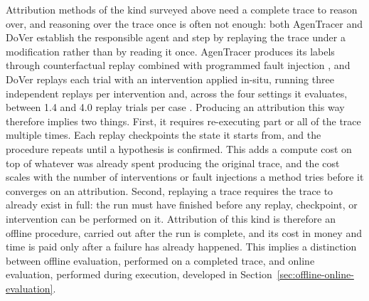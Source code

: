 Attribution methods of the kind surveyed above need a complete trace to reason over, and reasoning over the trace once is often not enough: both AgenTracer and DoVer establish the responsible agent and step by replaying the trace under a modification rather than by reading it once. AgenTracer produces its labels through counterfactual replay combined with programmed fault injection \cite{zhangAgenTracerWhoInducing2025}, and DoVer replays each trial with an intervention applied in-situ, running three independent replays per intervention and, across the four settings it evaluates, between 1.4 and 4.0 replay trials per case \cite{maDoVerInterventionDrivenAuto2026}. Producing an attribution this way therefore implies two things. First, it requires re-executing part or all of the trace multiple times. Each replay checkpoints the state it starts from, and the procedure repeats until a hypothesis is confirmed. This adds a compute cost on top of whatever was already spent producing the original trace, and the cost scales with the number of interventions or fault injections a method tries before it converges on an attribution. Second, replaying a trace requires the trace to already exist in full: the run must have finished before any replay, checkpoint, or intervention can be performed on it. Attribution of this kind is therefore an offline procedure, carried out after the run is complete, and its cost in money and time is paid only after a failure has already happened. This implies a distinction between offline evaluation, performed on a completed trace, and online evaluation, performed during execution, developed in Section~\ref{sec:offline-online-evaluation}.

